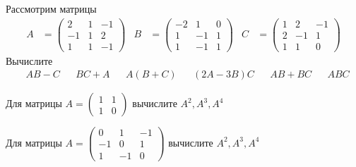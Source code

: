 \begin{exercise}
Рассмотрим матрицы
\begin{align*}
	A&=\begin{pmatrix}
		2 & 1 & -1 \\ -1 & 1 & 2 \\ 1 & 1 & -1 
	\end{pmatrix} &
	B&=\begin{pmatrix}
		-2 & 1 & 0 \\ 1 & -1 & 1 \\ 1 & -1 & 1 
	\end{pmatrix} &
		C&=\begin{pmatrix}
		1 & 2 & -1 \\ 2 & -1 & 1 \\ 1 & 1 & 0 
	\end{pmatrix}
\end{align*}
Вычислите
\begin{align*}
	& AB-C & &BC+A & &A(B+C) & &(2A-3B)C & &AB+BC & &ABC
\end{align*}
\end{exercise}

\begin{exercise}
Для матрицы \(A=\begin{pmatrix} 1 & 1 \\ 1 & 0 \end{pmatrix}\) вычислите
\(A^2, A^3, A^4\)
\end{exercise}
	
\begin{exercise}
Для матрицы \(A=\begin{pmatrix} 0 & 1 & -1 \\ -1 & 0 & 1 \\ 1 & -1 & 0 \end{pmatrix}\) вычислите
\(A^2, A^3, A^4\)
\end{exercise}
